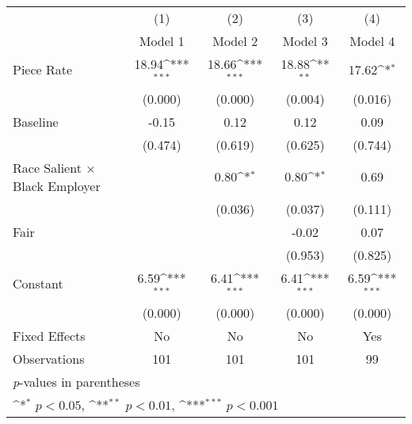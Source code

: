 {
\def\sym#1{\ifmmode^{#1}\else\(^{#1}\)\fi}
\begin{tabular*}{\hsize}{@{\hskip\tabcolsep\extracolsep\fill}l*{4}{c}}
\hline\hline
                    &\multicolumn{1}{c}{(1)}&\multicolumn{1}{c}{(2)}&\multicolumn{1}{c}{(3)}&\multicolumn{1}{c}{(4)}\\
                    &\multicolumn{1}{c}{Model 1}&\multicolumn{1}{c}{Model 2}&\multicolumn{1}{c}{Model 3}&\multicolumn{1}{c}{Model 4}\\
\hline
Piece Rate          &       18.94\sym{***}&       18.66\sym{***}&       18.88\sym{**} &       17.62\sym{*}  \\
                    &     (0.000)         &     (0.000)         &     (0.004)         &     (0.016)         \\
[1em]
Baseline            &       -0.15         &        0.12         &        0.12         &        0.09         \\
                    &     (0.474)         &     (0.619)         &     (0.625)         &     (0.744)         \\
[1em]
Race Salient $\times$ Black Employer&                     &        0.80\sym{*}  &        0.80\sym{*}  &        0.69         \\
                    &                     &     (0.036)         &     (0.037)         &     (0.111)         \\
[1em]
Fair                &                     &                     &       -0.02         &        0.07         \\
                    &                     &                     &     (0.953)         &     (0.825)         \\
[1em]
Constant            &        6.59\sym{***}&        6.41\sym{***}&        6.41\sym{***}&        6.59\sym{***}\\
                    &     (0.000)         &     (0.000)         &     (0.000)         &     (0.000)         \\
[1em]
Fixed Effects       &          No         &          No         &          No         &         Yes         \\
\hline
Observations        &         101         &         101         &         101         &          99         \\
\hline\hline
\multicolumn{5}{l}{\footnotesize \textit{p}-values in parentheses}\\
\multicolumn{5}{l}{\footnotesize \sym{*} \(p<0.05\), \sym{**} \(p<0.01\), \sym{***} \(p<0.001\)}\\
\end{tabular*}
}
